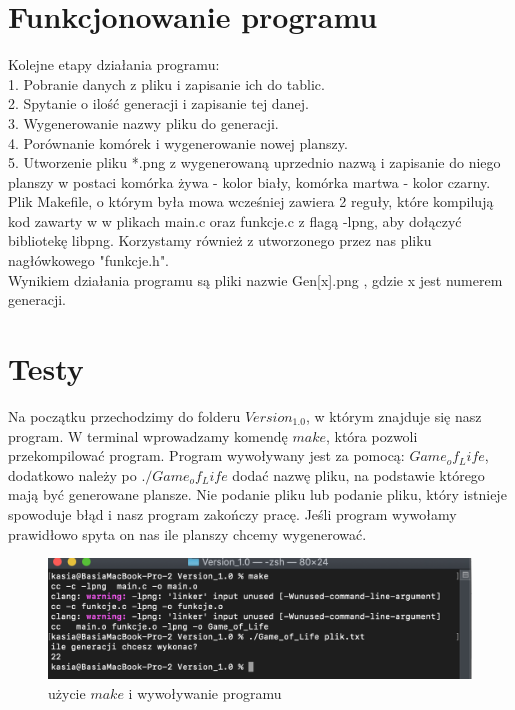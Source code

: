 \documentclass[11pt]{article}
\begin{document}
\section{Funkcjonowanie programu}

Kolejne etapy działania programu:
\\
1.	Pobranie danych z pliku i zapisanie ich do tablic.
\\
2.	Spytanie o ilość generacji i zapisanie tej danej.
\\
3.	Wygenerowanie nazwy pliku do generacji.
\\
4.	Porównanie komórek i wygenerowanie nowej planszy.
\\
5.  Utworzenie pliku *.png z wygenerowaną uprzednio nazwą i zapisanie do niego planszy w postaci komórka żywa - kolor biały, komórka martwa - kolor czarny.
\\
Plik Makefile, o którym była mowa wcześniej zawiera 2 reguły, które kompilują kod zawarty w w plikach main.c oraz funkcje.c z flagą -lpng, aby dołączyć bibliotekę libpng. Korzystamy również z utworzonego przez nas pliku nagłówkowego "funkcje.h".
\\
Wynikiem działania programu są pliki nazwie Gen[x].png , gdzie x jest numerem generacji.

\section{Testy}
Na początku przechodzimy do folderu $Version_1.0$, w którym znajduje się nasz program. W terminal wprowadzamy komendę $make$, która pozwoli przekompilować program. Program wywoływany jest za pomocą: $Game_of_Life$, dodatkowo należy po $./Game_of_Life$ dodać nazwę pliku, na podstawie którego mają być generowane plansze. Nie podanie pliku lub podanie pliku, który istnieje spowoduje błąd i nasz program zakończy pracę. Jeśli program wywołamy prawidłowo spyta on nas ile planszy chcemy wygenerować.

\begin{figure}[h!]
	\includegraphics[width=\linewidth]{wywolanie.png}
	\caption{użycie $make$ i wywoływanie programu}
\end{figure}
\end{document}
